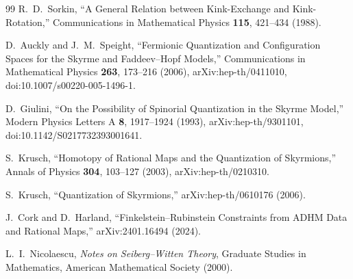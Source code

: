 \documentclass[11pt]{article}
\begin{document}
\begin{thebibliography}{99}
R.~D.~Sorkin,
``A General Relation between Kink-Exchange and Kink-Rotation,''
Communications in Mathematical Physics \textbf{115}, 421--434 (1988).

D.~Auckly and J.~M.~Speight,
``Fermionic Quantization and Configuration Spaces for the Skyrme and Faddeev--Hopf Models,''
Communications in Mathematical Physics \textbf{263}, 173--216 (2006),
arXiv:hep-th/0411010,
doi:10.1007/s00220-005-1496-1.

D.~Giulini,
``On the Possibility of Spinorial Quantization in the Skyrme Model,''
Modern Physics Letters A \textbf{8}, 1917--1924 (1993),
arXiv:hep-th/9301101,
doi:10.1142/S0217732393001641.

S.~Krusch,
``Homotopy of Rational Maps and the Quantization of Skyrmions,''
Annals of Physics \textbf{304}, 103--127 (2003),
arXiv:hep-th/0210310.

S.~Krusch,
``Quantization of Skyrmions,''
arXiv:hep-th/0610176 (2006).

J.~Cork and D.~Harland,
``Finkelstein--Rubinstein Constraints from ADHM Data and Rational Maps,''
arXiv:2401.16494 (2024).

L.~I.~Nicolaescu,
\emph{Notes on Seiberg--Witten Theory},
Graduate Studies in Mathematics,
American Mathematical Society (2000).

\end{thebibliography}
\endgroup
\end{document}
